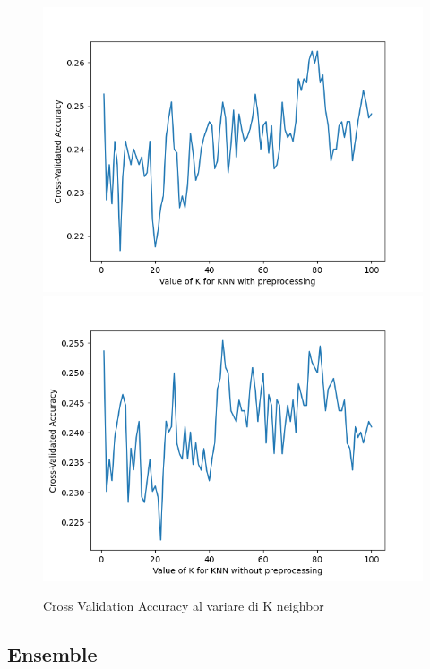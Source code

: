 \begin{figure}[H]
    \centering
    \includegraphics[width=0.55\columnwidth]{figures/K NeighBor Preproc.png}\includegraphics[width=0.55\columnwidth]{figures/K neight No Preproc.png}
    \caption{Cross Validation Accuracy al variare di K neighbor}
    \label{fig:target}
\end{figure}


\subsection{Ensemble}\label{ssec:Ensemble}


